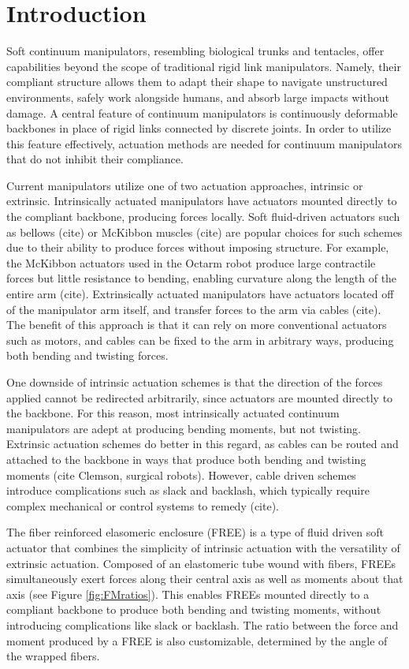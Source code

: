 \section{Introduction}
\label{sec:intro_draft}

Soft continuum manipulators, resembling biological trunks and tentacles, offer capabilities beyond the scope of traditional rigid link manipulators. Namely, their compliant structure allows them to adapt their shape to navigate unstructured environments, safely work alongside humans, and absorb large impacts without damage. A central feature of continuum manipulators is continuously deformable backbones in place of rigid links connected by discrete joints. In order to utilize this feature effectively, actuation methods are needed for continuum manipulators that do not inhibit their compliance.

Current manipulators utilize one of two actuation approaches, intrinsic or extrinsic. Intrinsically actuated manipulators have actuators mounted directly to the compliant backbone, producing forces locally. Soft fluid-driven actuators such as bellows (cite) or McKibbon muscles (cite) are popular choices for such schemes due to their ability to produce forces without imposing structure. For example, the McKibbon actuators used in the Octarm robot produce large contractile forces but little resistance to bending, enabling curvature along the length of the entire arm (cite). Extrinsically actuated manipulators have actuators located off of the manipulator arm itself, and transfer forces to the arm via cables (cite). The benefit of this approach is that it can rely on more conventional actuators such as motors, and cables can be fixed to the arm in arbitrary ways, producing both bending and twisting forces.

One downside of intrinsic actuation schemes is that the direction of the forces applied cannot be redirected arbitrarily, since actuators are mounted directly to the backbone. For this reason, most intrinsically actuated continuum manipulators are adept at producing bending moments, but not twisting. Extrinsic actuation schemes do better in this regard, as cables can be routed and attached to the backbone in ways that produce both bending and twisting moments (cite Clemson, surgical robots). However, cable driven schemes introduce complications such as slack and backlash, which typically require complex mechanical or control systems to remedy (cite).

The fiber reinforced elasomeric enclosure (FREE) is a type of fluid driven soft actuator that combines the simplicity of intrinsic actuation with the versatility of extrinsic actuation. Composed of an elastomeric tube wound with fibers, FREEs simultaneously exert forces along their central axis as well as moments about that axis (see Figure \ref{fig:FMratios}). This enables FREEs mounted directly to a compliant backbone to produce both bending and twisting moments, without introducing complications like slack or backlash. The ratio between the force and moment produced by a FREE is also customizable, determined by the angle of the wrapped fibers.

